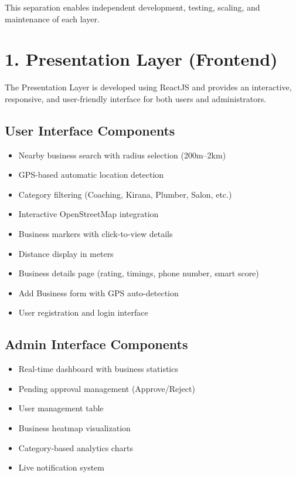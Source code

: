 \documentclass[12pt,a4paper]{report}
\begin{document}
This separation enables independent development, testing, scaling, and maintenance of each layer.

\section{1. Presentation Layer (Frontend)}

The Presentation Layer is developed using ReactJS and provides an interactive, responsive, and user-friendly interface for both users and administrators.

\subsection*{User Interface Components}

\begin{itemize}

\item Nearby business search with radius selection (200m--2km)

\item GPS-based automatic location detection

\item Category filtering (Coaching, Kirana, Plumber, Salon, etc.)

\item Interactive OpenStreetMap integration

\item Business markers with click-to-view details

\item Distance display in meters

\item Business details page (rating, timings, phone number, smart score)

\item Add Business form with GPS auto-detection

\item User registration and login interface

\end{itemize}

\subsection*{Admin Interface Components}

\begin{itemize}

\item Real-time dashboard with business statistics

\item Pending approval management (Approve/Reject)

\item User management table

\item Business heatmap visualization

\item Category-based analytics charts

\item Live notification system

\end{itemize}
\end{document}
